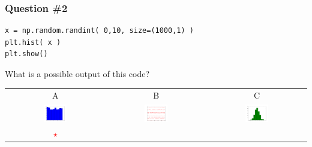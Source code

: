 \documentclass[11pt]{beamer}
\newcommand{\correctstar}{\textcolor{red}{$\star$}}
\begin{document}
\begin{frame}[fragile]
  \frametitle{Question \#2}
  \Enlarge

  \begin{Verbatim}
x = np.random.randint( 0,10, size=(1000,1) )
plt.hist( x )
plt.show()
  \end{Verbatim}

  What is a possible output of this code?

  \begin{center}
  \begin{tabular}{ccc}
    A & B & C \\
    \includegraphics[width=0.25\textwidth]{./img/figure_1.png}
    &
    \includegraphics[width=0.25\textwidth]{./img/figure_2.png}
    &
    \includegraphics[width=0.25\textwidth]{./img/figure_3.png}
    \\
    \correctstar & & \\
  \end{tabular}
  \end{center}
\end{frame}
\end{document}
